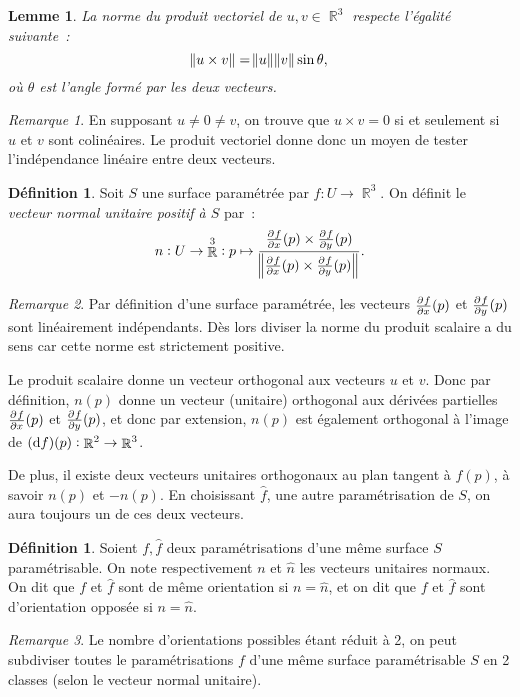 \documentclass{article}
\DeclareMathOperator{\R}{\mathbb R}
\newtheorem{lem}[thm]{Lemme}
\theoremstyle{definition}
\newtheorem{déf}[thm]{Définition}
\theoremstyle{remark}
\newtheorem*{rmq}{Remarque}
\begin{document}
		\begin{lem} La norme du produit vectoriel de $u, v \in \R^3$ respecte l'égalité suivante~:
		\[\norm{u \times v} = \norm u\norm v\sin\theta,\]
		où $\theta$ est l'angle formé par les deux vecteurs.
		\end{lem}

		\begin{rmq} En supposant $u \neq 0 \neq v$, on trouve que $u \times v = 0$ si et seulement si $u$ et $v$ sont colinéaires. Le produit vectoriel donne
		donc un moyen de tester l'indépendance linéaire entre deux vecteurs.
		\end{rmq}

		\begin{déf} Soit $S$ une surface paramétrée par $f : U \to \R^3$. On définit le \emph{vecteur normal unitaire positif à $S$} par~:
		\[n : U \to \R^3 : p \mapsto \frac {\pd fx(p) \times \pd fy(p)}{\norm{\pd fx(p) \times \pd fy(p)}}.\]
		\end{déf}

		\begin{rmq} Par définition d'une surface paramétrée, les vecteurs $\pd fx(p)$ et $\pd fy(p)$ sont linéairement indépendants. Dès lors diviser la norme
		du produit scalaire a du sens car cette norme est strictement positive.
		\end{rmq}

		Le produit scalaire donne un vecteur orthogonal aux vecteurs $u$ et $v$. Donc par définition, $n(p)$ donne un vecteur (unitaire) orthogonal aux
		dérivées partielles $\pd fx(p)$ et $\pd fy(p)$, et donc par extension, $n(p)$ est également orthogonal à l'image de $(\dif f)(p) : \R^2 \to \R^3$.

		De plus, il existe deux vecteurs unitaires orthogonaux au plan tangent à $f(p)$, à savoir $n(p)$ et $-n(p)$. En choisissant $\hat f$, une autre
		paramétrisation de $S$, on aura toujours un de ces deux vecteurs.

		\begin{déf} Soient $f, \hat f$ deux paramétrisations d'une même surface $S$ paramétrisable. On note respectivement $n$ et $\hat n$ les vecteurs unitaires
		normaux. On dit que $f$ et $\hat f$ sont de même orientation si $n = \widehat n$, et on dit que $f$ et $\hat f$ sont d'orientation opposée si
		$n = \hat n$.
		\end{déf}

		\begin{rmq} Le nombre d'orientations possibles étant réduit à 2, on peut subdiviser toutes le paramétrisations $f$ d'une même surface paramétrisable $S$
		en 2 classes (selon le vecteur normal unitaire).
		\end{rmq}
\end{document}
